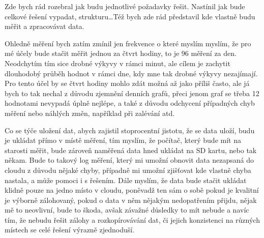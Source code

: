 Zde bych rád rozebral jak budu jednotlivé požadavky řešit. Nastínil jak bude celkové řešení vypadat, strukturu\ldots Též 
bych zde rád představil kde vlastně budu měřit a zpracovávat data.

Ohledně měření bych zatím zmínil jen frekvence o které myslím myslím, že pro mé účely bude stačit měřit jednou za čtvrt 
hodiny, to je 96 měření za den. Neodchytím tím sice drobné výkyvy v rámci minut, ale cílem je zachytit dlouhodobý průběh 
hodnot v rámci dne, kdy mne tak drobné výkyvy nezajímají. Pro tento účel by se čtvrt hodiny mohlo zdát možná až jako 
příliš často, ale já bych to tak nechal z důvodu zjemnění denních grafů, přeci jenom graf se třeba 12 hodnotami nevypadá 
úplně nejlépe, a také z důvodu odchycení případných chyb měření nebo náhlých změn, například při zalévání atd.

Co se týče uložení dat, abych zajistil stoprocentní jistotu, že se data uloží, budu je ukládat přímo v místě měření, tím 
myslím, že počítač, který bude mít na starosti měřit, bude zároveň naměřená data hned ukládat na SD kartu, nebo tak 
někam. Bude to takový log měření, který mi umožní obnovit data nezapsaná do cloudu z důvodu nějaké chyby, případně mi 
umožní zjišťovat kde vlastně chyba nastala, a může pomoci i s řešením. Dále myslím, že data bude stačit ukládat klidně 
pouze na jedno místo v cloudu, poněvadž ten sám o sobě pokud je kvalitní je výborně zálohovaný, pokud o data v něm 
nějakým nedopatřením přijdu, nějak mě to neovlivní, bude to škoda, avšak závažné důsledky to mít nebude a navíc tím, že 
nebudu řešit zálohy a rozkopírovávání dat, či jejich konzistenci na různých místech se celé řešení výrazně zjednoduší.

